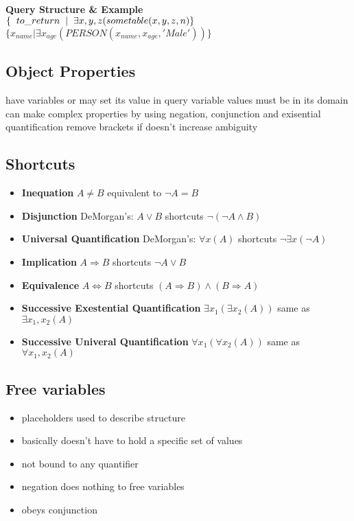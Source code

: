 \documentclass{article}
\newcommand\tab[1][0.5cm]{\hspace*{#1}}
\begin{document}
		\textbf{Query Structure \& Example}
		\\ \tab $\{ \tab[0.2cm] to\_return \tab[0.2cm]|\tab[0.2cm] \exists x,y,z(sometable(x,y,z,n)\}$
		\\ \tab $\{x_{name} | \exists x_{age} (PERSON(x_{name}, x_{age}, 'Male'))\}$

	\subsection{Object Properties}
		have variables or may set its value in query
		variable values must be in its domain
		can make complex properties by using negation, conjunction and exisential quantification
		remove brackets if doesn't increase ambiguity

	\subsection{Shortcuts}
		\begin{itemize}
			\item \textbf{Inequation} $A \neq B$ equivalent to $\neg A = B$
			\item \textbf{Disjunction} DeMorgan's: $A \vee B$ shortcuts $\neg(\neg A \wedge B)$
			\item \textbf{Universal Quantification} DeMorgan's: $\forall x (A)$ shortcuts $\neg \exists x (\neg A)$
			\item \textbf{Implication} $A \Rightarrow B $ shortcuts $ \neg A \vee B$
			\item \textbf{Equivalence} $A \Leftrightarrow B$ shortcuts $(A\Rightarrow B) \wedge (B \Rightarrow A)$ 
			\item \textbf{Successive Exestential Quantification} $\exists x_1 ( \exists x_2 (A))$ same as $\exists x_1,x_2(A)$
			\item \textbf{Successive Univeral Quantification} $\forall x_1 ( \forall x_2 (A))$ same as $\forall x_1,x_2(A)$
		\end{itemize}

	\subsection{Free variables}
		\begin{itemize}
			\item placeholders used to describe structure
			\item basically doesn't have to hold a specific set of values
			\item not bound to any quantifier
			\item negation does nothing to free variables
			\item obeys conjunction
		\end{itemize}
\end{document}
